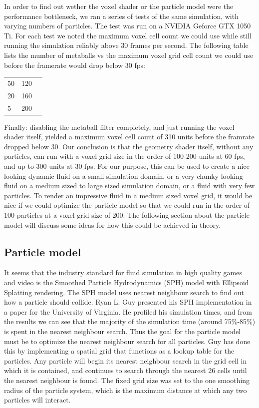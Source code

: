\documentclass{article}
\begin{document}
\begin{multicols}{2}
        In order to find out wether the voxel shader or the particle model were the performance bottleneck, we ran a series of tests of the same simulation, with varying numbers of particles.
        The test was run on a NVIDIA Geforce GTX 1050 Ti.
        For each test we noted the maximum voxel cell count we could use while still running the simulation reliably above 30 frames per second.
        The following table lists the mumber of metaballs vs the maximum voxel grid cell count we could use before the framerate would drop below 30 fps:

        \begin{tabular}{ l | c | r }
          50 & 120 \\
          20 & 160 \\
          5 & 200 \\
        \end{tabular}

        Finally: disabling the metaball filter completely, and just running the voxel shader itself, yielded a maximum voxel cell count of 310 units before the framrate dropped below 30.
        Our conclusion is that the geometry shader itself, without any particles, can run with a voxel grid size in the order of 100-200 units at 60 fps, and up to 300 units at 30 fps.
        For our purpose, this can be used to create a nice looking dynamic fluid on a small simulation domain, or a very chunky looking fluid on a medium sized to large sized simulation domain, or a fluid with very few particles.
        To render an impressive fluid in a medium sized voxel grid, it would be nice if we could optimize the particle model so that we could run in the order of 100 particles at a voxel grid size of 200.
        The following section about the particle model will discuss some ideas for how this could be achieved in theory.

        \subsection{Particle model}
        It seems that the industry standard for fluid simulation in high quality games and video is the Smoothed Particle Hydrodynamics (SPH) model with Ellipsoid Splatting rendering.
        The SPH model uses nearest neighbour search to find out how a particle should collide.
        Ryan L. Guy presented his SPH implementation in a paper for the University of Virginia. He profiled his simulation times, and from the results we can see that the majority of the simulation time (around 75\%-85\%) is spent in the nearest neighbour search.
        Thus the goal for the particle model must be to optimize the nearest neighbour search for all particles.
        Guy has done this by implementing a spatial grid that functions as a lookup table for the particles.
        Any particle will begin its nearest neighbour search in the grid cell in which it is contained, and continues to search through the nearest 26 cells until the nearest neighbour is found.
        The fixed grid size was set to the one smoothing radius of the particle system, which is the maximum distance at which any two particles will interact.
        \cite{guy15}


\end{multicols}
\end{document}
